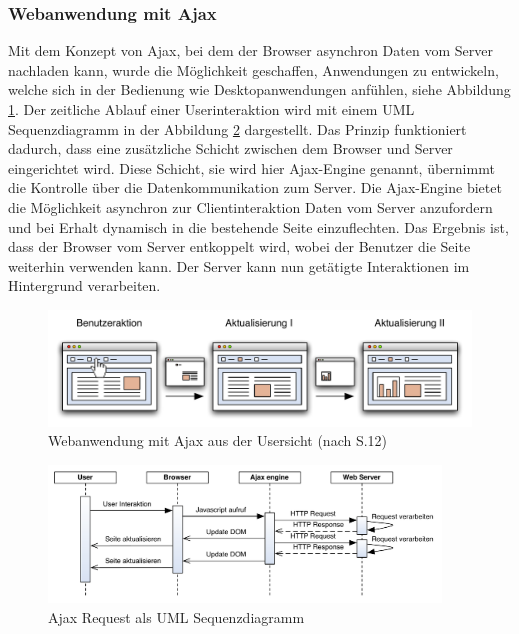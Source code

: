   \subsubsection{Webanwendung mit Ajax}
  
  Mit dem Konzept von \ac{Ajax}, bei dem der Browser asynchron Daten vom Server
  nachladen kann, wurde die Möglichkeit geschaffen, Anwendungen zu entwickeln,
  welche sich in der Bedienung wie Desktopanwendungen anfühlen, siehe Abbildung
  \ref{img:ajaxPageReload}. Der zeitliche Ablauf einer Userinteraktion wird mit
  einem \ac{UML} Sequenzdiagramm in der Abbildung
  \ref{img:sequenzdiagrammAjaxPageReload} dargestellt. Das Prinzip funktioniert
  dadurch, dass eine zusätzliche Schicht zwischen dem Browser und Server
  eingerichtet wird. Diese Schicht, sie wird hier Ajax-Engine genannt, übernimmt
  die Kontrolle über die Datenkommunikation zum Server. Die Ajax-Engine bietet
  die Möglichkeit asynchron zur Clientinteraktion Daten vom Server anzufordern
  und bei Erhalt dynamisch in die bestehende Seite einzuflechten. Das Ergebnis
  ist, dass der Browser vom Server entkoppelt wird, wobei der Benutzer die Seite
  weiterhin verwenden kann. Der Server kann nun getätigte Interaktionen im
  Hintergrund verarbeiten.
  \newline
  
  \begin{figure}[hbt]
    \begin{center}
      \includegraphics[width=\textwidth]{./image/ajaxPageReload.pdf}
      \caption{Webanwendung mit Ajax aus der Usersicht (nach
      \cite{DiplomarbeitStephanSchuster} S.12)}
      \label{img:ajaxPageReload}
    \end{center}
  \end{figure}
  
  \begin{figure}[hbt]
    \begin{center}
      \includegraphics[width=0.93\textwidth]{./image/sequenzdiagrammAjaxPageReload.pdf}
      \caption{Ajax Request als \ac{UML} Sequenzdiagramm}
      \label{img:sequenzdiagrammAjaxPageReload}
    \end{center}
  \end{figure}
  
